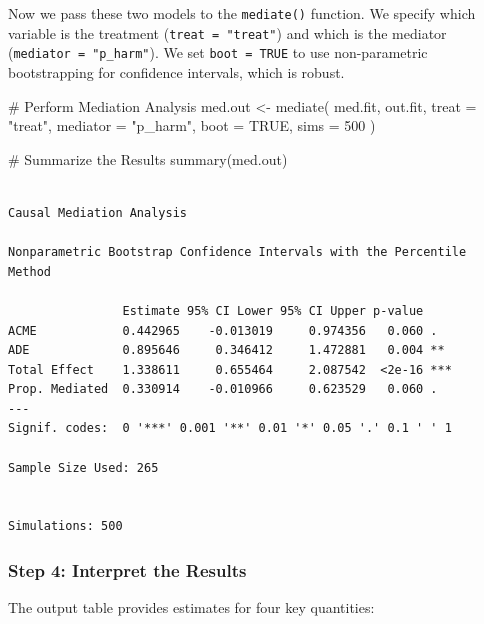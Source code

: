 \documentclass[
  10pt,
  letterpaper,
  DIV=11,
  numbers=noendperiod,
  oneside]{scrartcl}
\newenvironment{Shaded}{\begin{snugshade}}{\end{snugshade}}
\newcommand{\AttributeTok}[1]{\textcolor[rgb]{0.40,0.45,0.13}{#1}}
\newcommand{\CommentTok}[1]{\textcolor[rgb]{0.37,0.37,0.37}{#1}}
\newcommand{\ConstantTok}[1]{\textcolor[rgb]{0.56,0.35,0.01}{#1}}
\newcommand{\DecValTok}[1]{\textcolor[rgb]{0.68,0.00,0.00}{#1}}
\newcommand{\FunctionTok}[1]{\textcolor[rgb]{0.28,0.35,0.67}{#1}}
\newcommand{\NormalTok}[1]{\textcolor[rgb]{0.00,0.23,0.31}{#1}}
\newcommand{\OtherTok}[1]{\textcolor[rgb]{0.00,0.23,0.31}{#1}}
\newcommand{\StringTok}[1]{\textcolor[rgb]{0.13,0.47,0.30}{#1}}
\begin{document}
Now we pass these two models to the \texttt{mediate()} function. We
specify which variable is the treatment (\texttt{treat\ =\ "treat"}) and
which is the mediator (\texttt{mediator\ =\ "p\_harm"}). We set
\texttt{boot\ =\ TRUE} to use non-parametric bootstrapping for
confidence intervals, which is robust.

\begin{Shaded}
\begin{Highlighting}[]
\CommentTok{\# Perform Mediation Analysis}
\NormalTok{med.out }\OtherTok{\textless{}{-}} \FunctionTok{mediate}\NormalTok{(}
\NormalTok{  med.fit,}
\NormalTok{  out.fit,}
  \AttributeTok{treat =} \StringTok{"treat"}\NormalTok{,}
  \AttributeTok{mediator =} \StringTok{"p\_harm"}\NormalTok{,}
  \AttributeTok{boot =} \ConstantTok{TRUE}\NormalTok{,}
  \AttributeTok{sims =} \DecValTok{500}
\NormalTok{)}

\CommentTok{\# Summarize the Results}
\FunctionTok{summary}\NormalTok{(med.out)}
\end{Highlighting}
\end{Shaded}

\begin{verbatim}

Causal Mediation Analysis 

Nonparametric Bootstrap Confidence Intervals with the Percentile Method

                Estimate 95% CI Lower 95% CI Upper p-value    
ACME            0.442965    -0.013019     0.974356   0.060 .  
ADE             0.895646     0.346412     1.472881   0.004 ** 
Total Effect    1.338611     0.655464     2.087542  <2e-16 ***
Prop. Mediated  0.330914    -0.010966     0.623529   0.060 .  
---
Signif. codes:  0 '***' 0.001 '**' 0.01 '*' 0.05 '.' 0.1 ' ' 1

Sample Size Used: 265 


Simulations: 500 
\end{verbatim}

\subsubsection{Step 4: Interpret the
Results}\label{step-4-interpret-the-results}

The output table provides estimates for four key quantities:
\end{document}
